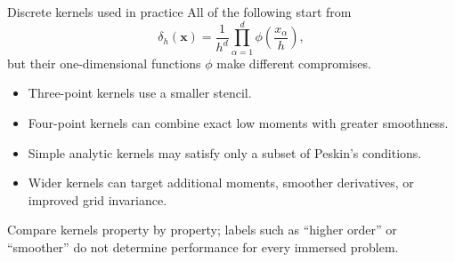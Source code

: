 \documentclass[aspectratio=169,11pt]{beamer}
\newcommand{\xvec}{\bm{x}}
\begin{document}
\begin{frame}{Discrete kernels used in practice}
All of the following start from
\[
  \delta_h(\xvec)
  =\frac{1}{h^d}\prod_{\alpha=1}^{d}
  \phi\!\left(\frac{x_\alpha}{h}\right),
\]
but their one-dimensional functions \(\phi\) make different compromises.

\begin{itemize}\itemsep7pt
  \item Three-point kernels use a smaller stencil. 
  \item Four-point kernels can combine exact low moments with greater smoothness.
  \item Simple analytic kernels may satisfy only a subset of Peskin's conditions.
  \item Wider kernels can target additional moments, smoother derivatives, or improved grid invariance.
\end{itemize}

\begin{punchbox}
Compare kernels property by property; labels such as ``higher order'' or ``smoother'' do not determine performance for every immersed problem.
\end{punchbox}
\end{frame}
\end{document}
